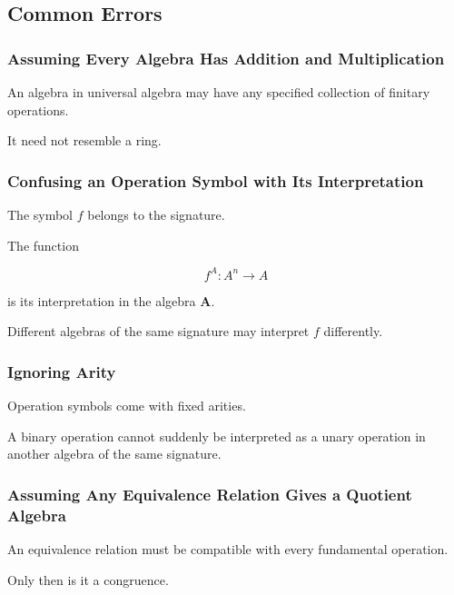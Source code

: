 \subsection{Common Errors}
\label{subsec:universal-algebra-common-errors}

\subsubsection{Assuming Every Algebra Has Addition and Multiplication}

An algebra in universal algebra may have any specified collection of
finitary operations.

It need not resemble a ring.

\subsubsection{Confusing an Operation Symbol with Its Interpretation}

The symbol \(f\) belongs to the signature.

The function

\[ f^A:A^n\to A \]

is its interpretation in the algebra \(\mathbf A\).

Different algebras of the same signature may interpret \(f\) differently.

\subsubsection{Ignoring Arity}

Operation symbols come with fixed arities.

A binary operation cannot suddenly be interpreted as a unary operation in
another algebra of the same signature.

\subsubsection{Assuming Any Equivalence Relation Gives a Quotient Algebra}

An equivalence relation must be compatible with every fundamental operation.

Only then is it a congruence.

